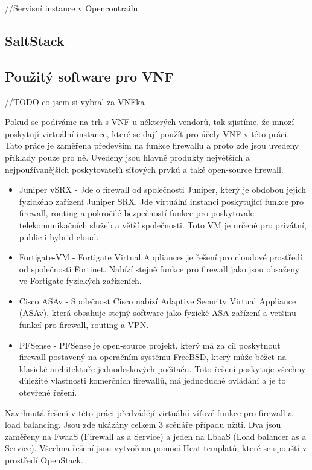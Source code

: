 //Servisní instance v Opencontrailu

\subsection{SaltStack}

\subsection{Použitý software pro VNF}

//TODO co jsem si vybral za VNFka

Pokud se podíváme na trh s VNF u některých vendorů, tak zjistíme, že mnozí poskytují virtuální instance, které se dají použít pro účely VNF v této práci. Tato práce je zaměřena především na funkce firewallu a proto zde jsou uvedeny příklady pouze pro ně. Uvedeny jsou hlavně produkty největších a nejpoužívanějších poskytovatelů síťových prvků a také open-source firewall.

\begin{itemize}
\item Juniper vSRX - Jde o firewall od společnosti Juniper, který je obdobou jejich fyzického zařízení Juniper SRX. Jde virtuální instanci poskytující funkce pro firewall, routing a pokročilé bezpečností funkce pro poskytovale telekomunikačních služeb a větší společnosti. Toto VM je určené pro privátní, public i hybrid cloud. 
\item Fortigate-VM - Fortigate Virtual Appliances je řešení pro cloudové prostředí od společnosti Fortinet. Nabízí stejně funkce pro firewall jako jsou obsaženy ve Fortigate fyzických zařízeních.
\item Cisco ASAv - Společnost Cisco nabízí Adaptive Security Virtual Appliance (ASAv), která obsahuje stejný software jako fyzické ASA zařízení a vetšinu funkcí pro firewall, routing a VPN. 
\item PFSense - PFSense je open-source projekt, který má za cíl poskytnout firewall postavený na operačním systému FreeBSD, který může běžet na klasické architektuře jednodeskových počítaču. Toto řešení poskytuje všechny důležité vlastnosti komerčních firewallů, má jednoduché ovládání a je to otevřené řešení.
\end{itemize} 

Navrhnutá řešení v této práci předvádějí virtuální víťové funkce pro firewall a load balancing. Jsou zde ukázány celkem 3 scénáře případu užíti. Dva jsou zaměřeny na FwaaS (Firewall as a Service) a jeden na LbaaS (Load balancer as a Service). Všechna řešení jsou vytvořena pomocí Heat templatů, které se spouští v prostředí OpenStack.


